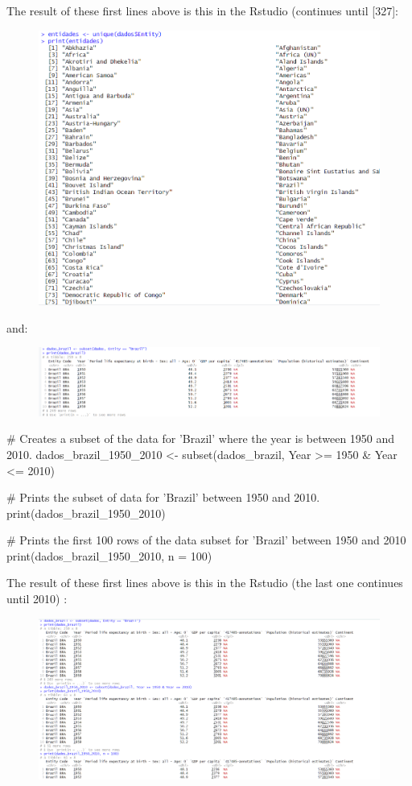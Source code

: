 \documentclass{article}
\begin{document}
The result of these first lines above is this in the Rstudio (continues until [327]:
\begin{figure}[H]
    \centering
    \includegraphics[width=1\linewidth]{imagesfolder/image12.png}
\end{figure}
and:
\begin{figure}[H]
    \centering
    \includegraphics[width=1\linewidth]{imagesfolder/image13.png}
\end{figure}

\begin{spverbatim}
# Creates a subset of the data for 'Brazil' where the year is between 1950 and 2010.
dados_brazil_1950_2010 <- subset(dados_brazil, Year >= 1950 & Year <= 2010)

# Prints the subset of data for 'Brazil' between 1950 and 2010.
print(dados_brazil_1950_2010)

# Prints the first 100 rows of the data subset for 'Brazil' between 1950 and 2010
print(dados_brazil_1950_2010, n = 100)
\end{spverbatim}

The result of these first lines above is this in the Rstudio (the last one continues until 2010) :
\begin{figure}[H]
    \centering
    \includegraphics[width=1\linewidth]{imagesfolder/image14.png}
\end{figure}
\end{document}
